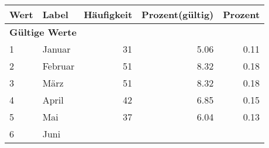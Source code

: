      \begin{longtable}{lXrrr}
     \toprule
     \textbf{Wert} & \textbf{Label} & \textbf{Häufigkeit} & \textbf{Prozent(gültig)} & \textbf{Prozent} \\
     \endhead
     \midrule
     \multicolumn{5}{l}{\textbf{Gültige Werte}}\\

     1 &
     \multicolumn{1}{X}{ Januar   } &


       \num{31} &
       \num[round-mode=places,round-precision=2]{5,06} &
         \num[round-mode=places,round-precision=2]{0,11} \\

     2 &
     \multicolumn{1}{X}{ Februar   } &


       \num{51} &
       \num[round-mode=places,round-precision=2]{8,32} &
         \num[round-mode=places,round-precision=2]{0,18} \\

     3 &
     \multicolumn{1}{X}{ März   } &


       \num{51} &
       \num[round-mode=places,round-precision=2]{8,32} &
         \num[round-mode=places,round-precision=2]{0,18} \\

     4 &
     \multicolumn{1}{X}{ April   } &


       \num{42} &
       \num[round-mode=places,round-precision=2]{6,85} &
         \num[round-mode=places,round-precision=2]{0,15} \\

     5 &
     \multicolumn{1}{X}{ Mai   } &


       \num{37} &
       \num[round-mode=places,round-precision=2]{6,04} &
         \num[round-mode=places,round-precision=2]{0,13} \\

     6 &
     \multicolumn{1}{X}{ Juni   } &



\end{longtable}
